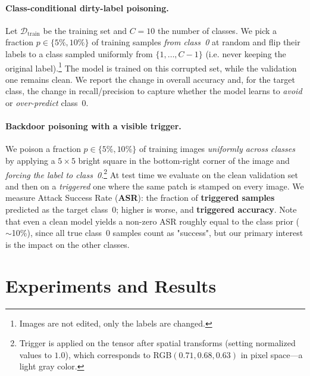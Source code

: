 \documentclass{article}
\begin{document}
\paragraph{Class-conditional dirty-label poisoning.}
Let $\mathcal{D}_{\text{train}}$ be the training set and $C{=}10$ the number of classes. We pick a fraction $p\in\{5\%,10\%\}$ of training samples \emph{from class~0} at random and flip their labels to a class sampled uniformly from $\{1,\dots,C-1\}$ (i.e. never keeping the original label).\footnote{Images are not edited, only the labels are changed.} The model is trained on this corrupted set, while the validation one remains clean. We report the change in overall accuracy and, for the target class, the change in recall/precision to capture whether the model learns to \emph{avoid} or \emph{over-predict} class~0.

\paragraph{Backdoor poisoning with a visible trigger.}\label{sec:backdoor-trigger}
We poison a fraction $p\in\{5\%,10\%\}$ of training images \emph{uniformly across classes} by applying a $5{\times}5$ bright square in the bottom-right corner of the image and \emph{forcing the label to class~0}.\footnote{Trigger is applied on the tensor after spatial transforms (setting normalized values to $1.0$), which corresponds to RGB$(0.71, 0.68, 0.63)$ in pixel space—a light gray color.} At test time we evaluate on the clean validation set and then on a \emph{triggered} one where the same patch is stamped on every image. We measure Attack Success Rate (\textbf{ASR}): the fraction of \textbf{triggered samples} predicted as the target class~0; higher is worse, and \textbf{triggered accuracy}. Note that even a clean model yields a non-zero ASR roughly equal to the class prior ($\sim$10\%), since all true class~0 samples count as "success", but our primary interest is the impact on the other classes.


\section{Experiments and Results}\label{sec:experiments}
\end{document}
